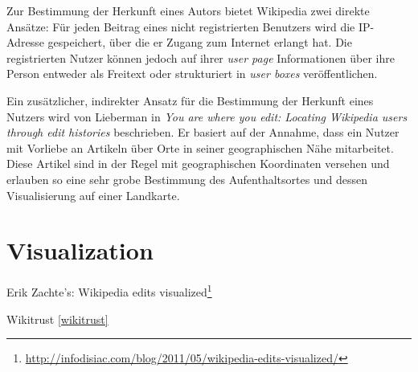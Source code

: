 Zur Bestimmung der Herkunft eines Autors bietet Wikipedia zwei direkte Ansätze: 
Für jeden Beitrag eines nicht registrierten Benutzers wird die IP-Adresse gespeichert, über die er Zugang zum Internet erlangt hat. 
Die registrierten Nutzer können jedoch auf ihrer \emph{user page} Informationen über ihre Person entweder als Freitext oder strukturiert in \emph{user boxes} veröffentlichen.

Ein zusätzlicher, indirekter Ansatz für die Bestimmung der Herkunft eines Nutzers wird von Lieberman in \emph{You are where you edit: Locating Wikipedia users through edit histories}\cite{lieberman2009you} beschrieben.
Er basiert auf der Annahme, dass ein Nutzer mit Vorliebe an Artikeln über Orte in seiner geographischen Nähe mitarbeitet. 
Diese Artikel sind in der Regel mit geographischen Koordinaten versehen und erlauben so eine sehr grobe Bestimmung des Aufenthaltsortes und dessen Visualisierung auf einer Landkarte.


\section{Visualization}\label{sec:visualization}


\begin{todos}
    \item Erik Zachte's: Wikipedia edits visualized\footnote{\url{http://infodisiac.com/blog/2011/05/wikipedia-edits-visualized/}}
    \item Wikitrust \ref{wikitrust}
\end{todos}
